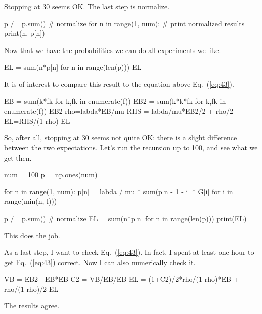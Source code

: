 \begin{exercise}{\faCalculator}
\begin{solution}
\begin{pyconsole}
\end{pyconsole}
Stopping at 30 seems OK. The last step is normalize.
\begin{pyconsole}
p /= p.sum()  # normalize
for n in range(1, num):  # print normalized results
    print(n, p[n])

\end{pyconsole}

Now that we have the probabilities we can do all experiments we like. 
\begin{pyconsole}
EL = sum(n*p[n] for n in range(len(p)))
EL 
\end{pyconsole}

It is of interest to compare this result to the equation above
Eq.~(\ref{eq:43}).


\begin{pyconsole}
EB = sum(k*fk for k,fk in enumerate(f))
EB2 = sum(k*k*fk for k,fk in enumerate(f))
EB2
rho=labda*EB/mu
RHS = labda/mu*EB2/2 + rho/2
EL=RHS/(1-rho)
EL
\end{pyconsole}

So, after all, stopping at 30 seems not quite OK: there is a slight
difference between the two expectations. Let's run the recursion up to
100, and see what we get then.

\begin{pyconsole}
num = 100
p = np.ones(num)

for n in range(1, num):
    p[n] = labda / mu * sum(p[n - 1 - i] * G[i] for i in range(min(n, l)))

p /= p.sum()  # normalize
EL = sum(n*p[n] for n in range(len(p)))
print(EL)
\end{pyconsole}
This does the job.

As a last step, I want to check Eq.~(\ref{eq:43}). In fact, I spent at least one hour to
get Eq.~(\ref{eq:43}) correct. Now I can also numerically check it.

\begin{pyconsole}
VB = EB2 - EB*EB
C2 = VB/EB/EB
EL = (1+C2)/2*rho/(1-rho)*EB + rho/(1-rho)/2
EL
\end{pyconsole}
The results agree. 
\end{solution}
\end{exercise}


